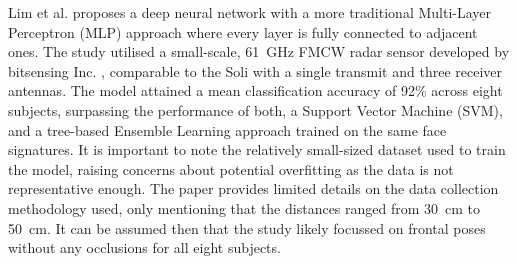 \documentclass{mpaper}
\begin{document}
Lim et al. \cite{lim2020dnn} proposes a deep neural network with a more traditional Multi-Layer Perceptron (MLP) approach where every layer is fully connected to adjacent ones. The study utilised a small-scale, \qty{61}{\GHz} FMCW radar sensor developed by bitsensing Inc. \cite{bitsensing2020bts60}, comparable to the Soli with a single transmit and three receiver antennas. The model attained a mean classification accuracy of 92\% across eight subjects, surpassing the performance of both, a Support Vector Machine (SVM), and a tree-based Ensemble Learning approach trained on the same face signatures. It is important to note the relatively small-sized dataset used to train the model, raising concerns about potential overfitting as the data is not representative enough. The paper provides limited details on the data collection methodology used, only mentioning that the distances ranged from \qty{30}{\cm} to \qty{50}{\cm}. It can be assumed then that the study likely focussed on frontal poses without any occlusions for all eight subjects. 
\end{document}
